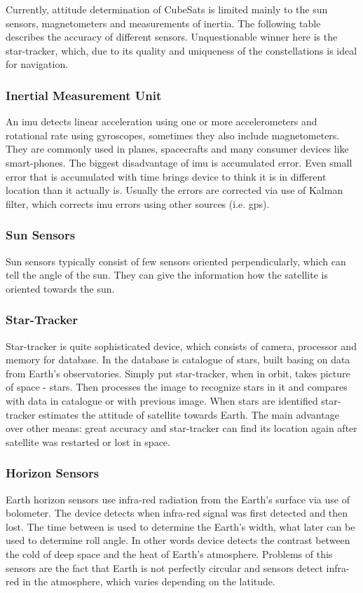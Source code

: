 \documentclass[12pt,a4paper,oneside]{article}
\begin{document}
Currently, attitude determination of CubeSats is limited mainly to the sun sensors, magnetometers and measurements of inertia. The following table describes the accuracy of different sensors. Unquestionable winner here is the star-tracker, which, due to its quality and uniqueness of the constellations is ideal for navigation. 

\subsubsection{Inertial Measurement Unit}
An \gls{imu} detects linear acceleration using one or more accelerometers and rotational rate using gyroscopes, sometimes they also include magnetometers. They are commonly used in planes, spacecrafts and many consumer devices like smart-phones. The biggest disadvantage of \gls{imu} is accumulated error. Even small error that is accumulated with time brings device to think it is in different location than it actually is. Usually the errors are corrected via use of Kalman filter, which corrects \gls{imu} errors using other sources (i.e. \gls{gps}).
\subsubsection{Sun Sensors}
Sun sensors typically consist of few sensors oriented perpendicularly, which can tell the angle of the sun. They can give the information how the satellite is oriented towards the sun.
\subsubsection{Star-Tracker}
Star-tracker is quite sophisticated device, which consists of camera, processor and memory for database. In the database is catalogue of stars, built basing on data from Earth's observatories. Simply put star-tracker, when in orbit, takes picture of space - stars. Then processes the image to recognize stars in it and compares with data in catalogue or with previous image. When stars are identified star-tracker estimates the attitude of satellite towards Earth. The main advantage over other means: great accuracy and star-tracker can find its location again after satellite was restarted or lost in space.
\subsubsection{Horizon Sensors}
Earth horizon sensors use infra-red radiation from the Earth's surface via use of bolometer. The device detects when infra-red signal was first detected and then lost. The time between is used to determine the Earth's width, what later can be used to determine roll angle. In other words device detects the contrast between the cold of deep space and the heat of Earth's atmosphere. Problems of this sensors are the fact that Earth is not perfectly circular and sensors detect infra-red in the atmosphere, which varies depending on the latitude.
\end{document}
